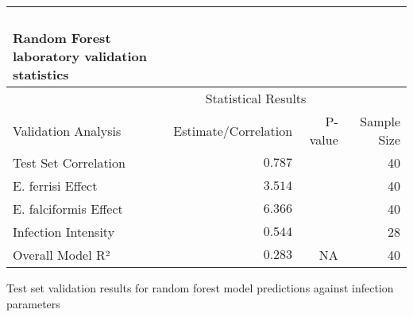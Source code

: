 \setlength{\LTpost}{0mm}
\begin{longtable}{lrrr}
\caption*{
{\large } \\ 
{\small Random Forest laboratory validation statistics}
} \\ 
\toprule
 & \multicolumn{2}{c}{Statistical Results} &  \\ 
\cmidrule(lr){2-3}
Validation Analysis & Estimate/Correlation & P-value & Sample Size \\ 
\midrule\addlinespace[2.5pt]
Test Set Correlation & $0.787$ & \cellcolor[HTML]{D3D3D3}{$0.00$} & 40 \\ 
E. ferrisi Effect & $3.514$ & \cellcolor[HTML]{D3D3D3}{$2.58 \times 10^{-2}$} & 40 \\ 
E. falciformis Effect & $6.366$ & \cellcolor[HTML]{D3D3D3}{$5.00 \times 10^{-4}$} & 40 \\ 
Infection Intensity & $0.544$ & \cellcolor[HTML]{D3D3D3}{$3.00 \times 10^{-4}$} & 28 \\ 
Overall Model R² & $0.283$ & NA & 40 \\ 
\bottomrule
\end{longtable}
\begin{minipage}{\linewidth}
Test set validation results for random forest model predictions against infection parameters\\
\end{minipage}

